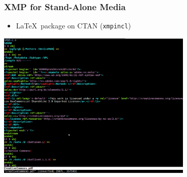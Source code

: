 \documentclass[mathserif,xcolor=dvipsnames,hyperref={bookmarks=true}]{beamer}
\begin{document}
    \begin{frame}[t]
        \frametitle{XMP for Stand-Alone Media}
        \begin{itemize}
            \item \LaTeX\ package on CTAN (\texttt{xmpincl})
        \end{itemize}
        \begin{center}
            \includegraphics[width=0.7\textwidth]{embedded_xmp.png}
        \end{center}
    \end{frame}
\end{document}
